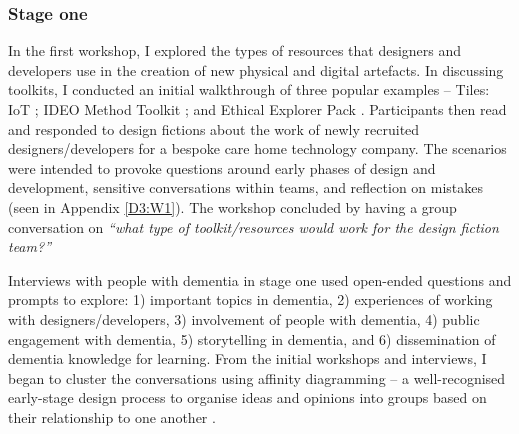 \subsubsection{Stage one}
In the first workshop, I explored the types of resources that designers and developers use in the creation of new physical and digital artefacts. In discussing toolkits, I conducted an initial walkthrough of three popular examples – Tiles: IoT \citep{mora2017tiles}; IDEO Method Toolkit \citep{fraga2020inclusive}; and Ethical Explorer Pack \citep{network_ethical_nodate}. Participants then read and responded to design fictions about the work of newly recruited designers/developers for a bespoke care home technology company. The scenarios were intended to provoke questions around early phases of design and development, sensitive conversations within teams, and reflection on mistakes (seen in Appendix \ref{D3:W1}). The workshop concluded by having a group conversation on \textit{``what type of toolkit/resources would work for the design fiction team?''}

Interviews with people with dementia in stage one used open-ended questions and prompts to explore: 1) important topics in dementia, 2) experiences of working with designers/developers, 3) involvement of people with dementia, 4) public engagement with dementia, 5) storytelling in dementia, and 6) dissemination of dementia knowledge for learning. From the initial workshops and interviews, I began to cluster the conversations using affinity diagramming – a well-recognised early-stage design process to organise ideas and opinions into groups based on their relationship to one another \citep{lucero2015using}. 


